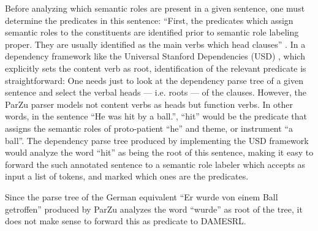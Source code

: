 Before analyzing which semantic roles are present in a given sentence, one
must determine the predicates in this sentence: ``First, the predicates which
assign semantic roles to the constituents are identified prior to semantic
role labeling proper. They are usually identified as the main verbs which
head clauses'' \citep[p.~74]{samardzic2013dynamics}. In a dependency framework
like the Universal Stanford Dependencies (USD) \citep{de2014universal},
which explicitly sets the content verb as root, identification of the
relevant predicate is straightforward: One needs just to look at the dependency
parse tree of a given sentence and select the verbal heads --- i.e. roots ---
of the clauses. However, the ParZu parser models not content verbs as heads but
function verbs. In other words,
in the sentence ``He was hit by a ball.'', ``hit'' would be the predicate that assigns
the semantic roles of proto-patient ``he'' and theme, or instrument ``a ball''.
The dependency parse tree produced by implementing the USD framework would
analyze the word ``hit'' as being the root of this sentence, making it easy to
forward the such annotated sentence to a semantic role labeler which accepts as
input a list of tokens, and marked which ones are the predicates.


Since the parse tree of the German equivalent ``Er wurde von einem Ball getroffen'' produced
by ParZu analyzes the word ``wurde'' as root of the tree, it does not make sense
to forward this as predicate to DAMESRL.



